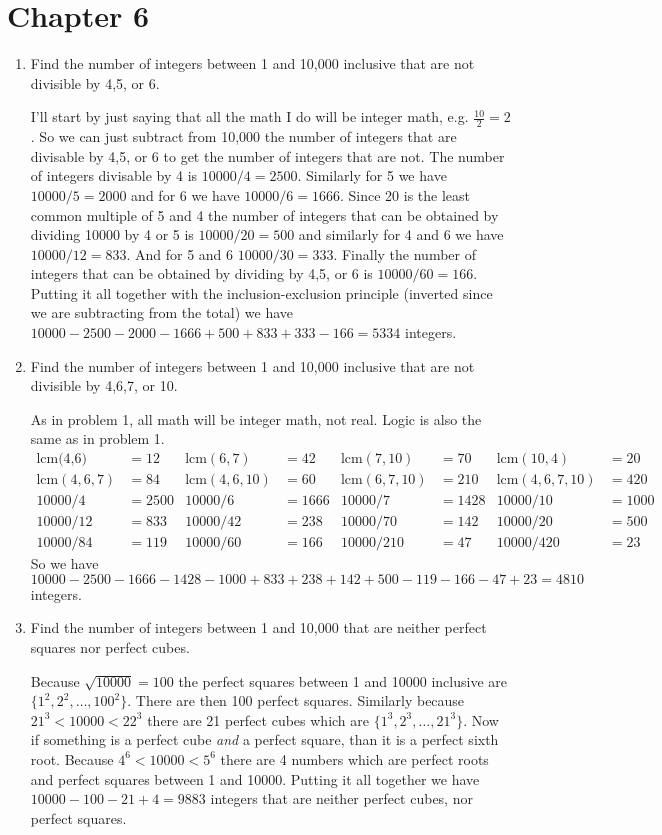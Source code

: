 \documentclass{article}
\begin{document}
\section*{Chapter 6}
\begin{enumerate}
\item
Find the number of integers between 1 and 10,000 inclusive that are not divisible by 4,5, or 6.

I'll start by just saying that all the math I do will be integer math, e.g. $\frac{10}{2}=2$. So we can just subtract from 10,000 the number of integers that are divisable by 4,5, or 6 to get the number of integers that are not. The number of integers divisable by 4 is $10000/4=2500$. Similarly for 5 we have $10000/5=2000$ and for 6 we have $10000/6=1666$. Since 20 is the least common multiple of 5 and 4 the number of integers that can be obtained by dividing 10000 by 4 or 5 is $10000/20=500$ and similarly for 4 and 6 we have $10000/12=833$. And for 5 and 6 $10000/30=333$. Finally the number of integers that can be obtained by dividing by 4,5, or 6 is $10000/60=166$. Putting it all together with the inclusion-exclusion principle (inverted since we are subtracting from the total) we have $10000-2500-2000-1666+500+833+333-166=5334$ integers.
\item
Find the number of integers between 1 and 10,000 inclusive that are not divisible by 4,6,7, or 10.

As in problem 1, all math will be integer math, not real. Logic is also the same as in problem 1.
\begin{align*}
  \text{lcm(4,6)}&=12&\text{lcm}(6,7)&=42&\text{lcm}(7,10)&=70&\text{lcm}(10,4)&=20\\
  \text{lcm}(4,6,7)&=84&\text{lcm}(4,6,10)&=60&\text{lcm}(6,7,10)&=210&\text{lcm}(4,6,7,10)&=420\\
  10000/4&=2500&10000/6&=1666&10000/7&=1428&10000/10&=1000\\
  10000/12&=833&10000/42&=238&10000/70&=142&10000/20&=500\\
  10000/84&=119&10000/60&=166&10000/210&=47&10000/420&=23
\end{align*}
So we have $10000-2500-1666-1428-1000+833+238+142+500-119-166-47+23=4810$ integers.
\item
Find the number of integers between 1 and 10,000 that are neither perfect squares nor perfect cubes.

Because $\sqrt{10000}=100$ the perfect squares between 1 and 10000 inclusive are $\{1^2,2^2,\dots,100^2\}$. There are then 100 perfect squares. Similarly because $21^3<10000<22^3$ there are 21 perfect cubes which are $\{1^3,2^3,\dots,21^3\}$. Now if something is a perfect cube \emph{and} a perfect square, than it is a perfect sixth root. Because $4^6<10000<5^6$ there are 4 numbers which are perfect roots and perfect squares between 1 and 10000. Putting it all together we have $10000-100-21+4=9883$ integers that are neither perfect cubes, nor perfect squares.
\end{enumerate}
\end{document}
